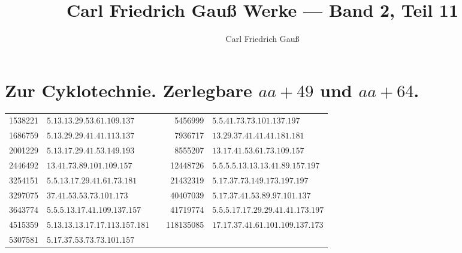 \documentclass[10pt,a4paper]{article}
\title{Carl Friedrich Gau\ss{} Werke --- Band 2, Teil 11}
\author{Carl Friedrich Gau\ss{}}
\date{}
\begin{document}
\maketitle
\thispagestyle{empty}

\tableofcontents
\newpage

\section{Zur Cyklotechnie. Zerlegbare $aa+49$ und $aa+64$.}

\begin{center}
\begin{tabular}{r l c r l}
1538221 & $5.13.13.29.53.61.109.137$ & \quad & 5456999 & $5.5.41.73.73.101.137.197$ \\
1686759 & $5.13.29.29.41.41.113.137$ & & 7936717 & $13.29.37.41.41.41.181.181$ \\
2001229 & $5.13.17.29.41.53.149.193$ & & 8555207 & $13.17.41.53.61.73.109.157$ \\
2446492 & $13.41.73.89.101.109.157$ & & 12448726 & $5.5.5.5.13.13.13.41.89.157.197$ \\
3254151 & $5.5.13.17.29.41.61.73.181$ & & 21432319 & $5.17.37.73.149.173.197.197$ \\
3297075 & $37.41.53.53.73.101.173$ & & 40407039 & $5.17.37.41.53.89.97.101.137$ \\
3643774 & $5.5.5.13.17.41.109.137.157$ & & 41719774 & $5.5.5.17.17.29.29.41.41.173.197$ \\
4515359 & $5.13.13.13.17.17.113.157.181$ & & 118135085 & $17.17.37.41.61.101.109.137.173$ \\
5307581 & $5.17.37.53.73.73.101.157$ & & & \\
\end{tabular}
\end{center}

\smallskip
\end{document}
